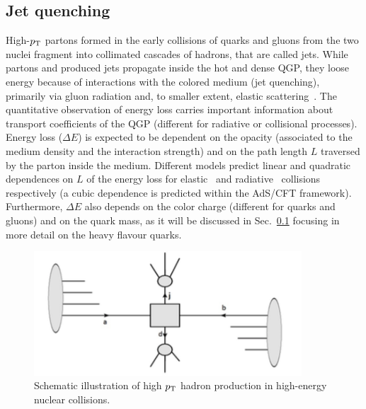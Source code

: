 \subsection{Jet quenching}
High-$p_{\rm T}$ partons formed in the early collisions of quarks and gluons from the two nuclei fragment into collimated cascades of hadrons, that are called jets. 
While partons and produced jets propagate inside the hot and dense QGP, they loose energy because of interactions with the colored medium (jet quenching), primarily via gluon radiation and, to smaller extent, elastic scattering~\cite{Qin:2015srf}. The quantitative observation of energy loss carries important information about transport coefficients of the QGP (different for radiative or collisional processes). Energy loss ($\Delta E$) is expected to be dependent on the opacity (associated to the medium density and the interaction strength) and on the path length $L$ traversed by the parton inside the medium. Different models predict linear and quadratic dependences on $L$ of the energy loss for elastic~\cite{Thoma:1990fm} and radiative~\cite{Baier:1996sk} collisions respectively (a cubic dependence is predicted within the AdS/CFT framework). Furthermore, $\Delta E$ also depends on the color charge (different for quarks and gluons) and on the quark mass, as it will be discussed in Sec.~\ref{} focusing in more detail on the heavy flavour quarks.

\begin{figure}[!ht]
  \centering
  \includegraphics[width=10cm]{FigCap1/Scattering.png}
  \caption{Schematic illustration of high $p_{\rm T}$ hadron production in high-energy nuclear collisions. }
  \label{fig:Scattering}
\end{figure}

